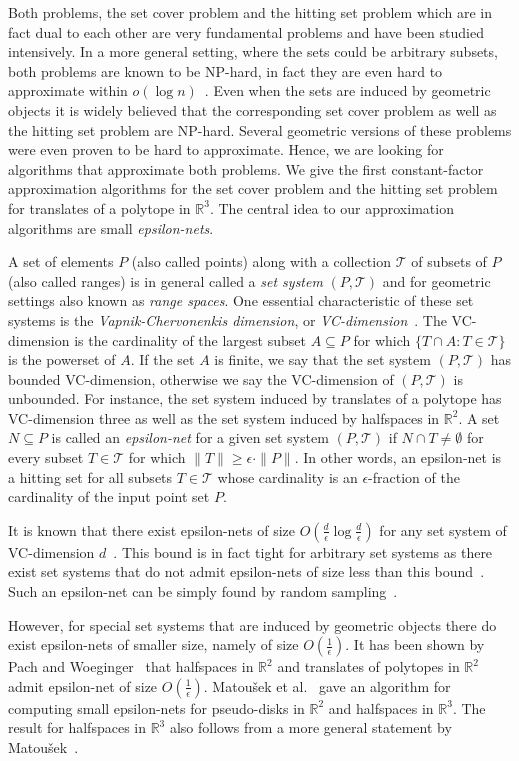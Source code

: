 \documentclass{stacs_proc}
\newcommand{\bigO}{O}
\newcommand{\setR}{\mathbb{R}}
\newcommand{\T}{\mathcal{T}}
\begin{document}
Both problems, the set cover problem and the hitting set problem which
are in fact dual to each other are very fundamental problems and have
been studied intensively. In a more general setting, where the sets
could be arbitrary subsets, both problems are known to be NP-hard, in
fact they are even hard to approximate within $o(\log
n)$~\cite{LY94}. Even when the sets are induced by geometric objects
it is widely believed that the corresponding set cover problem as well
as the hitting set problem are NP-hard. Several geometric versions of
these problems were even proven to be hard to approximate. Hence, we
are looking for algorithms that approximate both problems. We give the
first constant-factor approximation algorithms for the set cover
problem and the hitting set problem for translates of a polytope in
$\setR^3$. The central idea to our approximation algorithms are small
\emph{epsilon-nets}. 

A set of elements $P$ (also called points) along with a collection
$\T$ of subsets of $P$ (also called ranges) is in general called a
\emph{set system} $(P, \T)$ and for geometric settings also known as
\emph{range spaces}. One essential characteristic of these set systems
is the \emph{Vapnik-Chervonenkis dimension}, or
\emph{VC-dimension}~\cite{VC71}. The VC-dimension is the cardinality
of the largest subset $A\subseteq P$ for which $\{T\cap A : T\in \T\}$ is the powerset
of $A$. If the set $A$ is finite, we say that the set system $(P, \T)$
has bounded 
VC-dimension, otherwise we say the VC-dimension of $(P, \T)$ is 
unbounded. For instance, the set system induced by translates of a
polytope has VC-dimension three as well as the set system induced by
halfspaces in $\setR^2$.  A set $N\subseteq P$ is called an \emph{epsilon-net} for
a given set system $(P, \T)$ if $N\cap T\neq \emptyset$ for every subset $T\in\T$ for
which $\|T\|\geq \epsilon \cdot \|P\|$. In other words, an epsilon-net is a hitting set
for all subsets $T\in \T$ whose cardinality is an $\epsilon$-fraction of the
cardinality of the input point set $P$.  

It is known that there exist epsilon-nets of size
$\bigO\left(\frac{d}{\epsilon} \log \frac{d}{\epsilon}\right)$ for any set system of
VC-dimension $d$~\cite{BEHW89, KPW92}. This bound is in fact tight for
arbitrary set systems as there exist set systems that do not admit
epsilon-nets of size less than this bound~\cite{PW90}. Such an
epsilon-net can be simply found by random sampling~\cite{M}. 

However, for special set systems that are induced by geometric objects
there do exist epsilon-nets of smaller size, namely of size
$\bigO(\frac{1}{\epsilon})$. It has been shown by Pach and
Woeginger~\cite{PW90} that halfspaces in $\setR^2$ and translates of
polytopes in $\setR^2$ admit epsilon-net of size
$\bigO(\frac{1}{\epsilon})$. Matou\v{s}ek et al.~\cite{MSW90} gave an
algorithm for computing  small epsilon-nets for pseudo-disks in $\setR^2$
and halfspaces in $\setR^3$. The result for halfspaces in $\setR^3$ also
follows from a more general statement by Matou\v{s}ek~\cite{M92}.  
\end{document}
